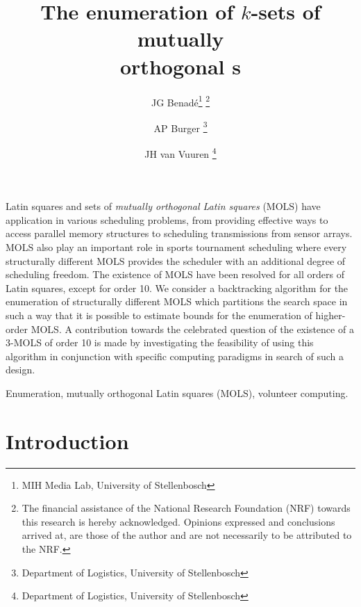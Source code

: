 \documentclass[11pt, a4paper]{article}
\title{The enumeration of $k$-sets of mutually\\ orthogonal  \lat s }
\author{JG Benad\'{e}\thanks{MIH Media Lab, University of Stellenbosch} \thanks{The financial assistance of the National Research Foundation (NRF) towards this research is hereby acknowledged. Opinions
expressed and conclusions arrived at, are those of the author and are not necessarily to be attributed to the NRF.} \and AP Burger \thanks{Department of Logistics, University of Stellenbosch} \and JH van Vuuren \thanks{Department of Logistics, University of Stellenbosch} }
\newcommand{\lat}{Latin square}
\newcounter{ls}
\begin{document}
\oriontitle
\begin{Abstract} 


\lat s and sets of \emph{mutually orthogonal \lat s} (MOLS) have  application in various scheduling problems, from providing effective ways to access parallel memory structures to scheduling transmissions from sensor arrays. MOLS  also play an important role in sports tournament scheduling where every structurally different MOLS provides the scheduler with an additional degree of scheduling freedom. The existence of MOLS have been resolved for all orders of \lat s, except for order 10. We consider a backtracking algorithm for the enumeration of structurally different MOLS which partitions the search space in such a way that it is possible to estimate bounds for the enumeration of higher-order MOLS. A contribution towards the celebrated question of the existence of a 3-MOLS of order 10 is made by investigating the feasibility of using this algorithm in conjunction with  specific computing paradigms in search of such a design. 
\end{Abstract}

\begin{keywords} 
Enumeration, mutually orthogonal \lat s (MOLS), volunteer computing. 
\end{keywords}

\section{Introduction}
\end{document}

